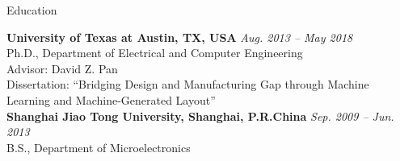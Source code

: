 

\begin{rSection}{Education}


{\bf University of Texas at Austin, TX, USA} \hfill {\em Aug. 2013 -- May 2018} \\ 
Ph.D., Department of Electrical and Computer Engineering \\
Advisor: David Z. Pan \\
Dissertation: ``Bridging Design and Manufacturing Gap through Machine Learning and Machine-Generated Layout'' \\

{\bf Shanghai Jiao Tong University, Shanghai, P.R.China} \hfill {\em Sep. 2009 -- Jun. 2013} \\ 
B.S., Department of Microelectronics \\

\end{rSection}


